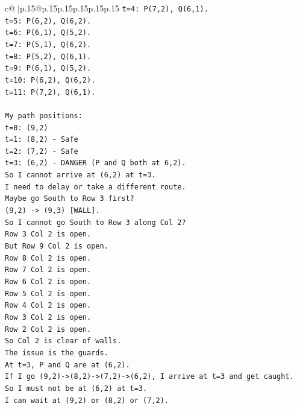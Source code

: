 \documentclass{article}
\begin{document}
{\begin{supertabular}{c@{$\;$}|p{.15\linewidth}@{}p{.15\linewidth}p{.15\linewidth}p{.15\linewidth}p{.15\linewidth}p{.15\linewidth}}
{{{\texttt{t=4: P(7,2), Q(6,1).} \\
\texttt{t=5: P(6,2), Q(6,2).} \\
\texttt{t=6: P(6,1), Q(5,2).} \\
\texttt{t=7: P(5,1), Q(6,2).} \\
\texttt{t=8: P(5,2), Q(6,1).} \\
\texttt{t=9: P(6,1), Q(5,2).} \\
\texttt{t=10: P(6,2), Q(6,2).} \\
\texttt{t=11: P(7,2), Q(6,1).} \\
\\ 
\texttt{My path positions:} \\
\texttt{t=0: (9,2)} \\
\texttt{t=1: (8,2) {-} Safe} \\
\texttt{t=2: (7,2) {-} Safe} \\
\texttt{t=3: (6,2) {-} DANGER (P and Q both at 6,2).} \\
\texttt{So I cannot arrive at (6,2) at t=3.} \\
\texttt{I need to delay or take a different route.} \\
\texttt{Maybe go South to Row 3 first?} \\
\texttt{(9,2) {-}> (9,3) {[}WALL{]}.} \\
\texttt{So I cannot go South to Row 3 along Col 2?} \\
\texttt{Row 3 Col 2 is open.} \\
\texttt{But Row 9 Col 2 is open.} \\
\texttt{Row 8 Col 2 is open.} \\
\texttt{Row 7 Col 2 is open.} \\
\texttt{Row 6 Col 2 is open.} \\
\texttt{Row 5 Col 2 is open.} \\
\texttt{Row 4 Col 2 is open.} \\
\texttt{Row 3 Col 2 is open.} \\
\texttt{Row 2 Col 2 is open.} \\
\texttt{So Col 2 is clear of walls.} \\
\texttt{The issue is the guards.} \\
\texttt{At t=3, P and Q are at (6,2).} \\
\texttt{If I go (9,2){-}>(8,2){-}>(7,2){-}>(6,2), I arrive at t=3 and get caught.} \\
\texttt{So I must not be at (6,2) at t=3.} \\
\texttt{I can wait at (9,2) or (8,2) or (7,2).} \\
}}}
\end{supertabular}}
\end{document}
